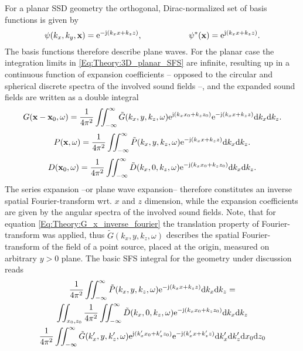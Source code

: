 For a planar SSD geometry the orthogonal, Dirac-normalized set of basis functions is given by 
\begin{equation}
\psi(k_x,k_y,\mathbf{x}) = \mathrm{e}^{-\mathrm{j} (k_x x + k_z z)}, \hspace{2cm} \psi^*(\mathbf{x}) = \mathrm{e}^{\mathrm{j} (k_x x + k_z z)}.
\end{equation}
The basis functions therefore describe plane waves.
For the planar case the integration limits in \eqref{Eq:Theory:3D_planar_SFS} are infinite, resulting up in a continuous function of expansion coefficients -- opposed to the circular and spherical discrete spectra of the involved sound fields --, and the expanded sound fields are written as a double integral
\begin{equation}
G(\mathbf{x} - \mathbf{x}_0,\omega) = \frac{1}{4\pi^2} \iint_{-\infty}^{\infty} \tilde{G}(k_x,y,k_z, \omega)  \mathrm{e}^{\mathrm{j} (k_x x_0 + k_z z_0)} \mathrm{e}^{-\mathrm{j} (k_x x + k_z z)} \mathrm{d} k_x \mathrm{d} k_z.
\label{Eq:Theory:G_x_inverse_fourier}
\end{equation}
\begin{equation}
P(\mathbf{x},\omega) = \frac{1}{4\pi^2} \iint_{-\infty}^{\infty} \tilde{P}(k_x,y,k_z, \omega) \mathrm{e}^{-\mathrm{j} (k_x x + k_z z)} \mathrm{d} k_x \mathrm{d} k_z.
\end{equation}
\begin{equation}
D(\mathbf{x}_0,\omega) = \frac{1}{4\pi^2} \iint_{-\infty}^{\infty} \tilde{D}(k_x,0,k_z, \omega) \mathrm{e}^{-\mathrm{j} (k_x x_0 + k_z z_0)} \mathrm{d} k_x \mathrm{d} k_z.
\end{equation}
The series expansion --or plane wave expansion-- therefore constitutes an inverse spatial Fourier-transform wrt. $x$ and $z$ dimension, while the expansion coefficients are given by the angular spectra of the involved sound fields. Note, that for equation \eqref{Eq:Theory:G_x_inverse_fourier} the translation property of Fourier-transform was applied, thus $ \tilde{G}(k_x,y,k_z, \omega)$ describes the spatial Fourier-transform of the field of a point source, placed at the origin, measured on arbitrary $y > 0$ plane.
The basic SFS integral for the geometry under discussion reads
\begin{multline}
\frac{1}{4\pi^2} \iint_{-\infty}^{\infty} \tilde{P}(k_x,y,k_z, \omega) \mathrm{e}^{-\mathrm{j} (k_x x + k_z z)} \mathrm{d} k_x \mathrm{d} k_z
= 
\\
\iint_{x_0,z_0}
\frac{1}{4\pi^2} \iint_{-\infty}^{\infty} \tilde{D}(k_x,0,k_z, \omega) \mathrm{e}^{-\mathrm{j} (k_x x_0 + k_z z_0)} \mathrm{d} k_x \mathrm{d} k_z
\\
\frac{1}{4\pi^2} \iint_{-\infty}^{\infty} \tilde{G}(k_x',y,k_z', \omega)  \mathrm{e}^{\mathrm{j} (k_x' x_0 + k_z' z_0)} \mathrm{e}^{-\mathrm{j} (k_x' x + k_z' z)} \mathrm{d} k_x' \mathrm{d} k_z'
\mathrm{d} x_0 \mathrm{d} z_0
\end{multline}
